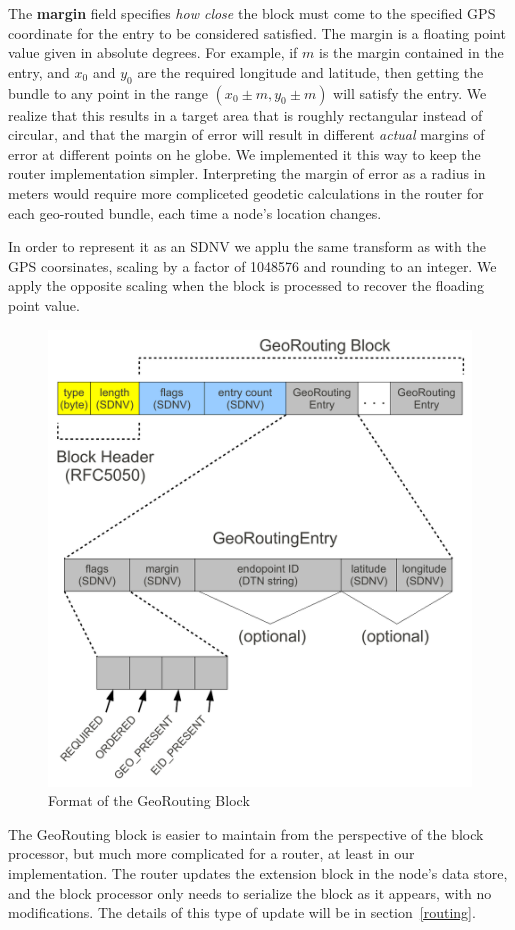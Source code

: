 The {\bf margin} field specifies {\it how close} the block must come to the specified GPS coordinate for the entry to be considered satisfied.  The margin is a floating point value given in absolute degrees.  For example, if $m$ is the margin contained in the entry, and $x_0$ and $y_0$ are the required longitude and latitude, then getting the bundle to any point in the range $(x_0\pm m, y_0\pm m)$ will satisfy the entry.  We realize that this results in a target area that is roughly rectangular instead of circular, and that the margin of error will result in different {\it actual} margins of error at different points on he globe.  We implemented it this way to keep the router implementation simpler.  Interpreting the margin of error as a radius in meters would require more compliceted geodetic calculations in the router for each geo-routed bundle, each time a node's location changes.

In order to represent it as an SDNV we applu the same transform as with the GPS coorsinates, scaling by a factor of 1048576 and rounding to an integer.  We apply the opposite scaling when the block is processed to recover the floading point value.

\begin{figure}
\begin{center}
\includegraphics[width=.9\columnwidth]{figures/georouting-block.pdf}
\end{center}
\caption{Format of the GeoRouting Block}
\label{fig:georouting-block}
\end{figure}

The GeoRouting block is easier to maintain from the perspective of the block processor, but much more complicated for a router, at least in our implementation.  The router updates the extension block in the node's data store, and the block processor only needs to serialize the block as it appears, with no modifications.  The details of this type of update will be in section~\ref{routing}.


